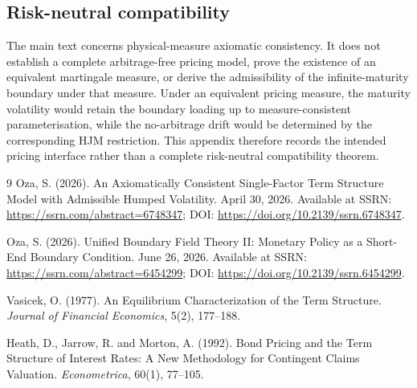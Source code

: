 \documentclass[11pt]{article}
\numberwithin{equation}{section}
\begin{document}
\begin{appendices}
\section{Risk-neutral compatibility}

The main text concerns physical-measure axiomatic consistency. It does not establish a complete arbitrage-free pricing model, prove the existence of an equivalent martingale measure, or derive the admissibility of the infinite-maturity boundary under that measure. Under an equivalent pricing measure, the maturity volatility would retain the boundary loading up to measure-consistent parameterisation, while the no-arbitrage drift would be determined by the corresponding HJM restriction. This appendix therefore records the intended pricing interface rather than a complete risk-neutral compatibility theorem.

\end{appendices}

\begin{thebibliography}{9}
Oza, S. (2026).
\newblock An Axiomatically Consistent Single-Factor Term Structure Model with Admissible Humped Volatility.
\newblock April 30, 2026. Available at SSRN: \url{https://ssrn.com/abstract=6748347}; DOI: \url{https://doi.org/10.2139/ssrn.6748347}.

Oza, S. (2026).
\newblock Unified Boundary Field Theory II: Monetary Policy as a Short-End Boundary Condition.
\newblock June 26, 2026. Available at SSRN: \url{https://ssrn.com/abstract=6454299}; DOI: \url{https://doi.org/10.2139/ssrn.6454299}.


Vasicek, O. (1977).
\newblock An Equilibrium Characterization of the Term Structure.
\newblock \emph{Journal of Financial Economics}, 5(2), 177--188.

Heath, D., Jarrow, R. and Morton, A. (1992).
\newblock Bond Pricing and the Term Structure of Interest Rates: A New Methodology for Contingent Claims Valuation.
\newblock \emph{Econometrica}, 60(1), 77--105.

\end{thebibliography}
\end{document}
